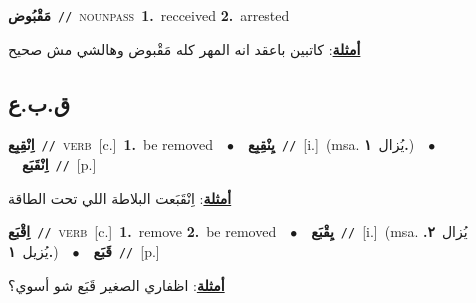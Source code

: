 \documentclass[10pt,a4paper,twoside]{article} %
\begin{document}
\begin{multicols}{2}
{{{{{{{{\setlength\topsep{0pt}\textbf{\foreignlanguage{arabic}{مَقْبُوض}}\ {\color{gray}\texttt{//}\color{black}}\ \textsc{noun\textunderscore pass}\ \textbf{1.}~recceived  \textbf{2.}~arrested\  \begin{flushright}\color{gray}\foreignlanguage{arabic}{\textbf{\underline{\foreignlanguage{arabic}{أمثلة}}}: كاتبين باعقد انه المهر كله مَقْبوض وهالشي مش صحيح}\end{flushright}\color{black}} \vspace{2mm}

\vspace{-3mm}
\subsection*{\color{blue}\foreignlanguage{arabic}{ق.ب.ع}\color{blue}{}} 

{\setlength\topsep{0pt}\textbf{\foreignlanguage{arabic}{اِنْقِبِع}}\ {\color{gray}\texttt{//}\color{black}}\ \textsc{verb}\ [c.]\ \textbf{1.}~be removed\ \ $\bullet$\ \ \setlength\topsep{0pt}\textbf{\foreignlanguage{arabic}{يِنْقِبِع}}\ {\color{gray}\texttt{//}\color{black}}\ [i.]\ \color{gray}(msa. \foreignlanguage{arabic}{يُزال}~\foreignlanguage{arabic}{\textbf{١.}})\color{black}\ \ $\bullet$\ \ \setlength\topsep{0pt}\textbf{\foreignlanguage{arabic}{اِنْقَبَع}}\ {\color{gray}\texttt{//}\color{black}}\ [p.]\  \begin{flushright}\color{gray}\foreignlanguage{arabic}{\textbf{\underline{\foreignlanguage{arabic}{أمثلة}}}: اِنْقَبَعت البلاطة اللي تحت الطاقة}\end{flushright}\color{black}} \vspace{2mm}

{\setlength\topsep{0pt}\textbf{\foreignlanguage{arabic}{اِقْبَع}}\ {\color{gray}\texttt{//}\color{black}}\ \textsc{verb}\ [c.]\ \textbf{1.}~remove  \textbf{2.}~be removed\ \ $\bullet$\ \ \setlength\topsep{0pt}\textbf{\foreignlanguage{arabic}{يِقْبَع}}\ {\color{gray}\texttt{//}\color{black}}\ [i.]\ \color{gray}(msa. \foreignlanguage{arabic}{يُزال}~\foreignlanguage{arabic}{\textbf{٢.}}  \foreignlanguage{arabic}{يُزيل}~\foreignlanguage{arabic}{\textbf{١.}})\color{black}\ \ $\bullet$\ \ \setlength\topsep{0pt}\textbf{\foreignlanguage{arabic}{قَبَع}}\ {\color{gray}\texttt{//}\color{black}}\ [p.]\  \begin{flushright}\color{gray}\foreignlanguage{arabic}{\textbf{\underline{\foreignlanguage{arabic}{أمثلة}}}: اظفاري الصغير قَبَع شو أسوي؟}\end{flushright}\color{black}} \vspace{2mm}

}}}}}}}
\end{multicols}
\end{document}
